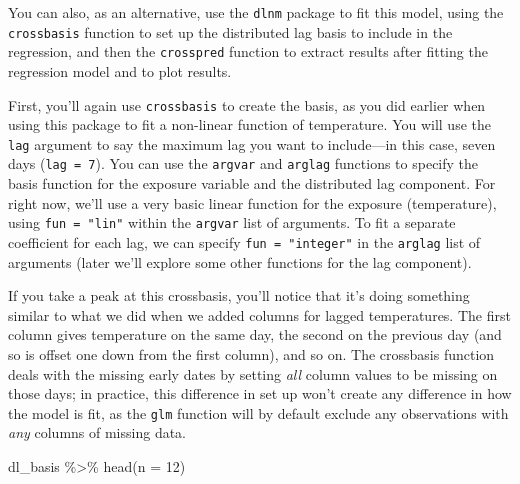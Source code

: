 \documentclass[
]{book}
\newenvironment{Shaded}{\begin{snugshade}}{\end{snugshade}}
\newcommand{\AttributeTok}[1]{\textcolor[rgb]{0.77,0.63,0.00}{#1}}
\newcommand{\DecValTok}[1]{\textcolor[rgb]{0.00,0.00,0.81}{#1}}
\newcommand{\FunctionTok}[1]{\textcolor[rgb]{0.00,0.00,0.00}{#1}}
\newcommand{\NormalTok}[1]{#1}
\newcommand{\OtherTok}[1]{\textcolor[rgb]{0.56,0.35,0.01}{#1}}
\newcommand{\SpecialCharTok}[1]{\textcolor[rgb]{0.00,0.00,0.00}{#1}}
\newcommand{\StringTok}[1]{\textcolor[rgb]{0.31,0.60,0.02}{#1}}
\begin{document}
You can also, as an alternative, use the \texttt{dlnm} package to fit this
model, using the \texttt{crossbasis} function
to set up the distributed lag basis to include in the regression, and then the \texttt{crosspred}
function to extract results after fitting the regression model and to plot results.

First, you'll again use \texttt{crossbasis} to create the basis, as you did earlier when using this
package to fit a non-linear function of temperature. You will use the \texttt{lag} argument to say
the maximum lag you want to include---in this case, seven days (\texttt{lag\ =\ 7}). You can use
the \texttt{argvar} and \texttt{arglag} functions to specify the basis function for the exposure variable
and the distributed lag component. For right now, we'll use a very basic linear function for
the exposure (temperature), using \texttt{fun\ =\ "lin"} within the \texttt{argvar} list of arguments.
To fit a separate coefficient for each lag, we can specify \texttt{fun\ =\ "integer"} in the
\texttt{arglag} list of arguments (later we'll explore some other functions for the lag component).

\begin{Shaded}
\end{Shaded}

If you take a peak at this crossbasis, you'll notice that it's doing something similar to
what we did when we added columns for lagged temperatures. The first column gives temperature
on the same day, the second on the previous day (and so is offset one down from the first
column), and so on. The crossbasis function deals with the missing early dates by setting
\emph{all} column values to be missing on those days; in practice, this difference in set up
won't create any difference in how the model is fit, as the \texttt{glm} function will by default
exclude any observations with \emph{any} columns of missing data.

\begin{Shaded}
\begin{Highlighting}[]
\NormalTok{dl\_basis }\SpecialCharTok{\%\textgreater{}\%} 
  \FunctionTok{head}\NormalTok{(}\AttributeTok{n =} \DecValTok{12}\NormalTok{)}
\end{Highlighting}
\end{Shaded}
\end{document}
